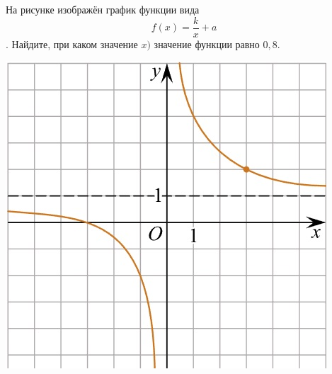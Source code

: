 \begin{homework}[number=2]
\begin{listofex}
	\end{listofex}
\end{homework}
%
\begin{class}[number=5]
	\begin{listofex}
		\item
		\begin{minipage}[t]{0.66\textwidth}
			На рисунке изображён график функции вида \[ f(x)=\dfrac{k}{x}+a \]. Найдите, при каком значение \(x)\) значение функции равно \(0,8\).
		\end{minipage}
		\hspace{0.05\textwidth}
		\begin{minipage}[t]{0.22\textwidth}
			\includegraphics[align=t, width=\textwidth]{pics/G101M4C5-1.jpg}

\end{minipage}
\end{listofex}
\end{class}
